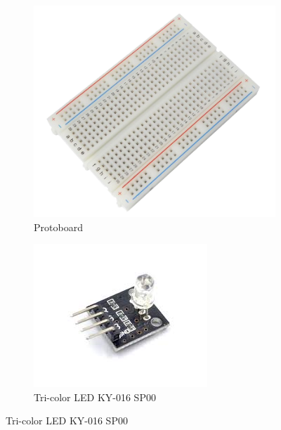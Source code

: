 \documentclass{article}
\begin{document}
\begin{figure}[H]
	\centering
	\begin{subfigure}[b]{0.45\textwidth}
		\includegraphics[width=\textwidth]{../images/protoboard.png}
		\caption*{Protoboard}
		\label{fig:protoboard}
	\end{subfigure}
	\hfill
	\begin{subfigure}[b]{0.45\textwidth}
		\includegraphics[width=\textwidth]{../images/led_tricolor.jpg}
		\caption*{Tri-color LED KY-016 SP00}
		\label{fig:led tricolor}
	\end{subfigure}
\end{figure}
\end{document}
